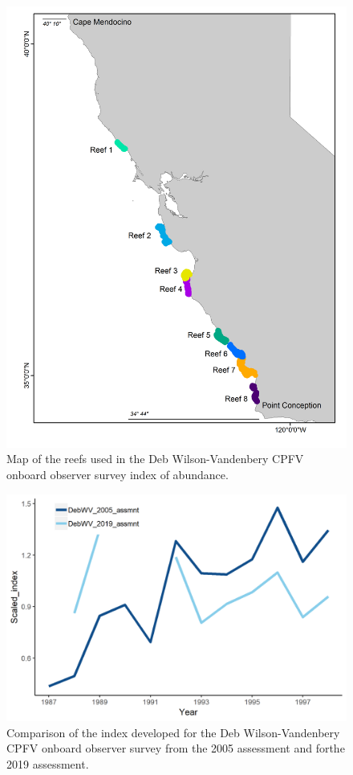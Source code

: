 \documentclass[12pt,]{article}
\begin{document}
\begin{figure}
\centering
\includegraphics{Figures/DebWV_sites.png}
\caption{Map of the reefs used in the Deb Wilson-Vandenbery CPFV onboard
observer survey index of abundance. \label{fig:DebWV_sites}}
\end{figure}

\begin{figure}
\centering
\includegraphics{Figures/DebWV_index_compare.png}
\caption{Comparison of the index developed for the Deb Wilson-Vandenbery
CPFV onboard observer survey from the 2005 assessment and forthe 2019
assessment. \label{fig:DebWV_index_compare}}
\end{figure}
\end{document}
